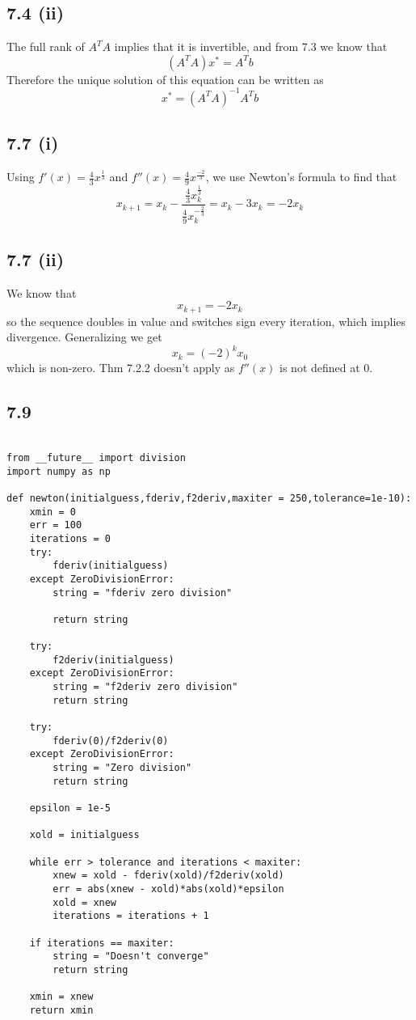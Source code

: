 \documentclass[letterpaper,12pt]{article}
\theoremstyle{definition}
\begin{document}
\subsection*{7.4 (ii)}
The full rank of $A^TA$ implies that it is invertible, and from 7.3 we know that \[(A^TA)x^* = A^Tb\] Therefore the unique solution of this equation can be written as \[x^* = (A^TA)^{-1}A^Tb\]
\subsection*{7.7 (i)}


Using $f'(x)=\frac{4}{3}x^{\frac{1}{3}}$ and $f''(x)=\frac{4}{9}x^{\frac{-2}{3}}$, we use Newton's formula to find that
\[x_{k+1}=x_k- \frac{\frac{4}{3}x_k^{\frac{1}{3}}}{\frac{4}{9}x_k^{-\frac{2}{3}}}=x_k-3x_k=-2x_k\]

\subsection*{7.7 (ii)}

We know that \[x_{k+1}=-2x_k\] so the sequence doubles in value and switches sign every iteration, which implies divergence. Generalizing we get \[x_k=  (-2)^kx_0\] which is non-zero. Thm 7.2.2 doesn't apply as $f''(x)$ is not defined at $0$.\\


\subsection*{7.9}

\begin{lstlisting}

from __future__ import division
import numpy as np
 
def newton(initialguess,fderiv,f2deriv,maxiter = 250,tolerance=1e-10):
    xmin = 0    
    err = 100
    iterations = 0
    try:
        fderiv(initialguess)
    except ZeroDivisionError:
        string = "fderiv zero division"
         
        return string
 
    try:
        f2deriv(initialguess)
    except ZeroDivisionError:
        string = "f2deriv zero division"
        return string
     
    try:
        fderiv(0)/f2deriv(0)
    except ZeroDivisionError:
        string = "Zero division"
        return string
     
    epsilon = 1e-5
 
    xold = initialguess
 
    while err > tolerance and iterations < maxiter:
        xnew = xold - fderiv(xold)/f2deriv(xold)
        err = abs(xnew - xold)*abs(xold)*epsilon
        xold = xnew
        iterations = iterations + 1
 
    if iterations == maxiter:
        string = "Doesn't converge"
        return string
 
    xmin = xnew
    return xmin

\end{lstlisting}
\end{document}
